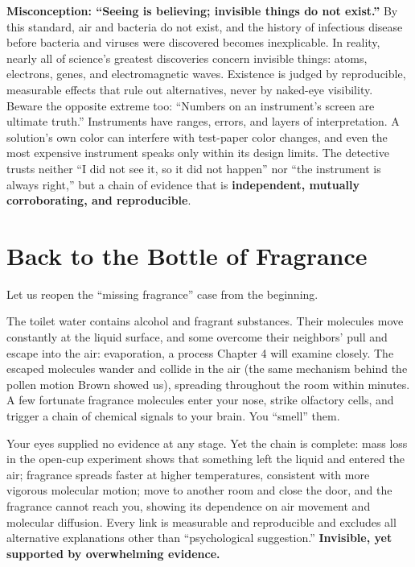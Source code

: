 \begin{wuqu}
\textbf{Misconception: ``Seeing is believing; invisible things do not exist.''} By this standard, air and bacteria do not exist, and the history of infectious disease before bacteria and viruses were discovered becomes inexplicable. In reality, nearly all of science's greatest discoveries concern invisible things: atoms, electrons, genes, and electromagnetic waves. Existence is judged by reproducible, measurable effects that rule out alternatives, never by naked-eye visibility. Beware the opposite extreme too: ``Numbers on an instrument's screen are ultimate truth.'' Instruments have ranges, errors, and layers of interpretation. A solution's own color can interfere with test-paper color changes, and even the most expensive instrument speaks only within its design limits. The detective trusts neither ``I did not see it, so it did not happen'' nor ``the instrument is always right,'' but a chain of evidence that is \textbf{independent, mutually corroborating, and reproducible}.
\end{wuqu}

\section{Back to the Bottle of Fragrance}

Let us reopen the ``missing fragrance'' case from the beginning.

The toilet water contains alcohol and fragrant substances. Their molecules move constantly at the liquid surface, and some overcome their neighbors' pull and escape into the air: evaporation, a process Chapter 4 will examine closely. The escaped molecules wander and collide in the air (the same mechanism behind the pollen motion Brown showed us), spreading throughout the room within minutes. A few fortunate fragrance molecules enter your nose, strike olfactory cells, and trigger a chain of chemical signals to your brain. You ``smell'' them.

Your eyes supplied no evidence at any stage. Yet the chain is complete: mass loss in the open-cup experiment shows that something left the liquid and entered the air; fragrance spreads faster at higher temperatures, consistent with more vigorous molecular motion; move to another room and close the door, and the fragrance cannot reach you, showing its dependence on air movement and molecular diffusion. Every link is measurable and reproducible and excludes all alternative explanations other than ``psychological suggestion.'' \textbf{Invisible, yet supported by overwhelming evidence.}

